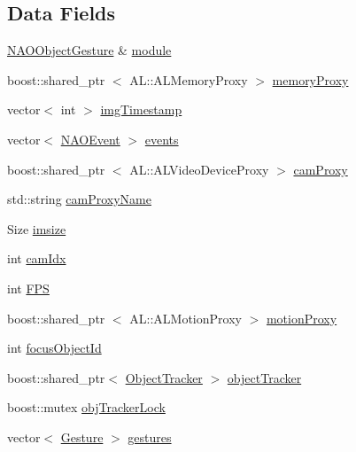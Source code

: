 \subsection*{\-Data \-Fields}
\begin{DoxyCompactItemize}
\item 
\hyperlink{classNAOObjectGesture}{\-N\-A\-O\-Object\-Gesture} \& \hyperlink{structNAOObjectGesture_1_1Impl_ae2615fc048db5be9b400ba5b7deb6980}{module}
\item 
boost\-::shared\-\_\-ptr\*
$<$ \-A\-L\-::\-A\-L\-Memory\-Proxy $>$ \hyperlink{structNAOObjectGesture_1_1Impl_a12cd61e269e3c26768b34ffe854ae6dd}{memory\-Proxy}
\item 
vector$<$ int $>$ \hyperlink{structNAOObjectGesture_1_1Impl_af085e6baa8d70fa8962b159660c705e7}{img\-Timestamp}
\item 
vector$<$ \hyperlink{classNAOEvent}{\-N\-A\-O\-Event} $>$ \hyperlink{structNAOObjectGesture_1_1Impl_a3b56ec4a0988f9a4be880e639daef919}{events}
\item 
boost\-::shared\-\_\-ptr\*
$<$ \-A\-L\-::\-A\-L\-Video\-Device\-Proxy $>$ \hyperlink{structNAOObjectGesture_1_1Impl_a7f3333960dcdb8c5d2114dbf32a24c79}{cam\-Proxy}
\item 
std\-::string \hyperlink{structNAOObjectGesture_1_1Impl_a4619593469888ecf2f468bba2373e66a}{cam\-Proxy\-Name}
\item 
\-Size \hyperlink{structNAOObjectGesture_1_1Impl_ae7d3d3b424b5ad9e625f7a215dab3160}{imsize}
\item 
int \hyperlink{structNAOObjectGesture_1_1Impl_aaf3eaa1152daea02503245eddea980d5}{cam\-Idx}
\item 
int \hyperlink{structNAOObjectGesture_1_1Impl_a07741a945613dbed3d9b0087bfa51cd7}{\-F\-P\-S}
\item 
boost\-::shared\-\_\-ptr\*
$<$ \-A\-L\-::\-A\-L\-Motion\-Proxy $>$ \hyperlink{structNAOObjectGesture_1_1Impl_ad914fd06f913bb5d96339c51e3fa93b3}{motion\-Proxy}
\item 
int \hyperlink{structNAOObjectGesture_1_1Impl_a860b8d5c365d44d0bc4f165697eea703}{focus\-Object\-Id}
\item 
boost\-::shared\-\_\-ptr$<$ \hyperlink{classObjectTracker}{\-Object\-Tracker} $>$ \hyperlink{structNAOObjectGesture_1_1Impl_aa98e02a034324da8feb27c5dd1bd9445}{object\-Tracker}
\item 
boost\-::mutex \hyperlink{structNAOObjectGesture_1_1Impl_a0b4c8927f99c8124ed9030a1fda7eb65}{obj\-Tracker\-Lock}
\item 
vector$<$ \hyperlink{classGesture}{\-Gesture} $>$ \hyperlink{structNAOObjectGesture_1_1Impl_a30138d62a9caeb6bd82af19880ffd6dd}{gestures}

\end{DoxyCompactItemize}
